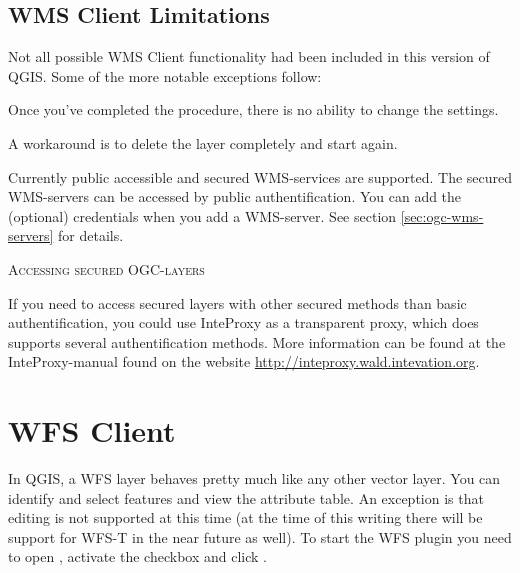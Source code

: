 \subsection{WMS Client Limitations}\label{sec:ogc-wms-limits}

Not all possible WMS Client functionality had been included in this version of QGIS.
Some of the more notable exceptions follow:


Once you've completed the 
procedure, there is no ability to change the settings.

A workaround is to delete the layer completely and start again.


Currently public accessible and secured WMS-services are supported.
The secured WMS-servers can be accessed by public authentification. You
can add the (optional) credentials when you add a WMS-server. See section
\ref{sec:ogc-wms-servers} for details.

\begin{Tip}[ht]\caption{\textsc{Accessing secured OGC-layers}}
If you need to access secured layers with other secured methods
than basic authentification, you could use InteProxy as
a transparent proxy, which does supports several authentification methods.
More information can be found at the InteProxy-manual found on the website
\url{http://inteproxy.wald.intevation.org}.
\end{Tip}

%
%
\section{WFS Client}\label{sec:ogc-wfs}

In QGIS, a WFS layer behaves pretty much like any other vector layer. You
can identify and select features and view the attribute table. An exception
is that editing is not supported at this time (at the time of this writing
there will be support for WFS-T in the near future as well).
To start the WFS plugin you
need to open  \arrow {},
activate the  checkbox and click .

